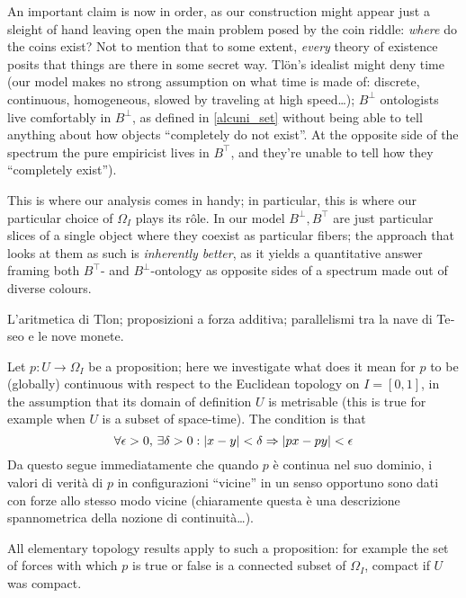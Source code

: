 \begin{remark}
	An important claim is now in order, as our construction might appear just a sleight of hand leaving open the main problem posed by the coin riddle: \emph{where} do the coins exist? Not to mention that to some extent, \emph{every} theory of existence posits that things are there in some secret way. Tl\"on's idealist might deny time (our model makes no strong assumption on what time is made of: discrete, continuous, homogeneous, slowed by traveling at high speed\dots); $B^\bot$ ontologists live comfortably in $B^\bot$, as defined in \autoref{alcuni_set} without being able to tell anything about how objects ``completely do not exist''.
	At the opposite side of the spectrum the pure empiricist lives in $B^\top$, and they're unable to tell how they ``completely exist'').

	This is where our analysis comes in handy; in particular, this is where our particular choice of $\Omega_I$ plays its r\^ole. In our model $B^\perp, B^\top$ are just particular slices of a single object where they coexist as particular fibers; the approach that looks at them as such is \emph{inherently better}, as it yields a quantitative answer framing both $B^\top$- and $B^\bot$-ontology as opposite sides of a spectrum made out of diverse colours.
\end{remark}
\begin{italian}
	\begin{remark}\label{di_navi_e_numeri}
		L'aritmetica di Tlon; proposizioni a forza additiva; parallelismi tra la nave di Teseo e le nove monete.
	\end{remark}
\end{italian}
\begin{remark}\label{continuiti}
	Let $p : U \to \Omega_I$ be a proposition; here we investigate what does it mean for $p$ to be (globally) continuous with respect to the Euclidean topology on $I=[0,1]$, in the assumption that its domain of definition $U$ is metrisable (this is true for example when $U$ is a subset of space-time). The condition is that
	\[ \forall \epsilon > 0,\,\exists \delta > 0 : |x-y|< \delta \Rightarrow |px-py| < \epsilon \]
	Da questo segue immediatamente che quando $p$ è continua nel suo dominio, i valori di verità di $p$ in configurazioni ``vicine'' in un senso opportuno sono dati con forze allo stesso modo vicine (chiaramente questa è una descrizione spannometrica della nozione di continuità\dots).

	All elementary topology results apply to such a proposition: for example the set of forces with which $p$ is true or false is a connected subset of $\Omega_I$, compact if $U$ was compact.
\end{remark}
